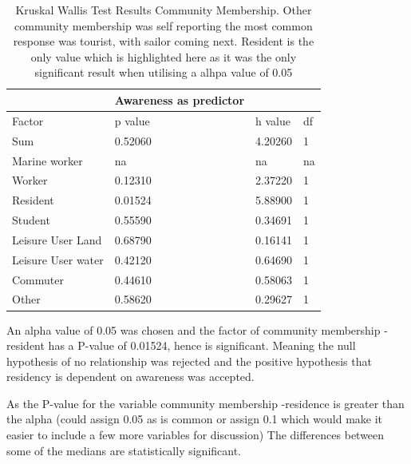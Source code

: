 \begin{table}[h!]
    \centering
    \begin{tabular}{|l|l|l|l|}
    \hline
         ~ &Awareness as predictor & ~ & ~ \\ \hline
        Factor & p value & h value & df \\ \hline
        Sum & 0.52060 & 4.20260 & 1 \\ \hline
        Marine worker & na & na & na \\ \hline
        Worker & 0.12310 & 2.37220 & 1 \\ \hline
        Resident & \cellcolor[HTML]{7df9ff} 0.01524 & 5.88900 & 1 \\ \hline
        Student & 0.55590 & 0.34691 & 1 \\ \hline
        Leisure User Land & 0.68790 & 0.16141 & 1 \\ \hline
        Leisure User water & 0.42120 & 0.64690 & 1 \\ \hline
        Commuter & 0.44610 & 0.58063 & 1 \\ \hline
        Other & 0.58620 & 0.29627 & 1 \\ \hline
    \end{tabular}
    \caption{Kruskal Wallis Test Results Community Membership. Other community membership was self reporting the most common response was tourist, with sailor coming next. Resident is the only value which is highlighted here as it was the only significant result when utilising a alhpa value of 0.05}
    \label{Kruskal_wallis_test_general}
\end{table}

An alpha value of 0.05 was chosen and the factor of community membership - resident has a P-value of 0.01524, hence is significant. Meaning the null hypothesis of no relationship was rejected and the positive hypothesis that residency is dependent on awareness was accepted. 




As the P-value for the variable community membership -residence is greater than the alpha (could assign 0.05 as is common or assign 0.1 which would make it easier to include a few more variables for discussion) The differences between some of the medians are statistically significant.

